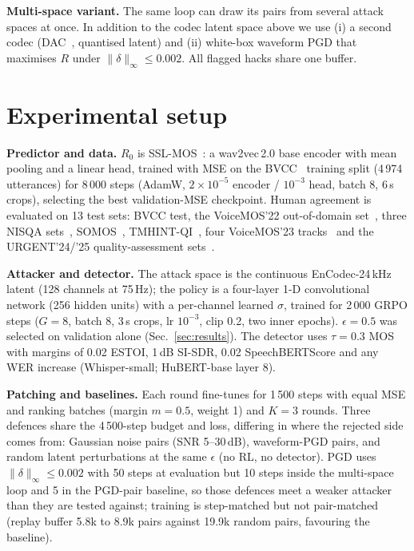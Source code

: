 \documentclass[conference]{IEEEtran}
\begin{document}
\noindent\textbf{Multi-space variant.}
The same loop can draw its pairs from several attack spaces at once. In addition to the codec latent space above
we use (i) a second codec (DAC~\cite{kumar2023dac}, quantised latent) and (ii) white-box waveform PGD that
maximises $R$ under $\|\delta\|_\infty\le 0.002$. All flagged hacks share one buffer.

\section{Experimental setup}
\label{sec:setup}
\noindent\textbf{Predictor and data.} $R_0$ is SSL-MOS~\cite{cooper2022generalization}: a wav2vec\,2.0 base %
encoder with mean pooling and a linear head, trained with MSE on the BVCC~\cite{cooper2021bvcc} training %
split (4\,974 utterances) %
for 8\,000 steps (AdamW, $2\!\times\!10^{-5}$ encoder / $10^{-3}$ head, batch 8, 6\,s crops), selecting the best %
validation-MSE checkpoint. Human agreement is evaluated on 13 test sets: BVCC test, the VoiceMOS'22
out-of-domain set~\cite{huang2022voicemos,wu2019blizzard}, three NISQA sets~\cite{mittag2021nisqa}, %
SOMOS~\cite{maniati2022somos}, TMHINT-QI~\cite{chen2022inqss}, four VoiceMOS'23
tracks~\cite{cooper2023voicemos} and the URGENT'24/'25 quality-assessment %
sets~\cite{zhang2024urgent,saijo2025urgent}.

\noindent\textbf{Attacker and detector.} The attack space is the continuous EnCodec-24\,kHz latent %
(128 channels at 75\,Hz); the policy is a four-layer 1-D convolutional network (256 hidden units) with a %
per-channel learned $\sigma$, trained for 2\,000 GRPO steps ($G=8$, batch 8, 3\,s crops, lr $10^{-3}$, %
clip 0.2, two inner epochs). $\epsilon=0.5$ was selected on validation alone (Sec.~\ref{sec:results}). The detector uses $\tau=0.3$ MOS with margins of 0.02 ESTOI, 1\,dB SI-SDR, 0.02
SpeechBERTScore and any WER increase (Whisper-small; HuBERT-base layer 8). %

\noindent\textbf{Patching and baselines.} Each round fine-tunes for 1\,500 steps with equal MSE and ranking %
batches (margin $m=0.5$, weight 1) and $K=3$ rounds. Three defences share the 4\,500-step budget and loss, %
differing in where the rejected side comes from: Gaussian noise pairs (SNR 5--30\,dB), waveform-PGD %
pairs, and random latent perturbations at the same $\epsilon$ (no RL, no detector). PGD uses
$\|\delta\|_\infty\!\le\!0.002$ with 50 steps at evaluation but 10 steps inside the multi-space loop and 5 in the %
PGD-pair baseline, so those defences meet a weaker attacker than they are tested against; training is
step-matched but not pair-matched (replay buffer 5.8k to 8.9k pairs against 19.9k random pairs, %
favouring the baseline).
\end{document}
